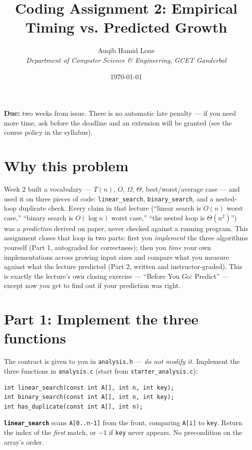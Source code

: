 \documentclass[11pt]{article}
\title{Coding Assignment 2: Empirical Timing vs. Predicted Growth}
\author{Auqib Hamid Lone\\[0.3em]
  \emph{Department of Computer Science \& Engineering}, \emph{GCET Ganderbal}}
\date{\today}
\begin{document}
\maketitle

\noindent\textbf{Due:} two weeks from issue. There is no automatic late penalty --- if you need more time, ask before the deadline and an extension will be granted (see the course policy in the syllabus).

\section{Why this problem}

Week 2 built a vocabulary --- $T(n)$, $O$, $\Omega$, $\Theta$, best/worst/average case --- and used it on three pieces of code: \texttt{linear\_search}, \texttt{binary\_search}, and a nested-loop duplicate check. Every claim in that lecture (``linear search is $O(n)$ worst case,'' ``binary search is $O(\log n)$ worst case,'' ``the nested loop is $\Theta(n^2)$'') was a \emph{prediction} derived on paper, never checked against a running program. This assignment closes that loop in two parts: first you \emph{implement} the three algorithms yourself (Part 1, autograded for correctness); then you \emph{time} your own implementations across growing input sizes and compare what you measure against what the lecture predicted (Part 2, written and instructor-graded). This is exactly the lecture's own closing exercise --- ``Before You Go: Predict'' --- except now you get to find out if your prediction was right.

\section{Part 1: Implement the three functions}

The contract is given to you in \texttt{analysis.h} --- \emph{do not modify it}. Implement the three functions in \texttt{analysis.c} (start from \texttt{starter\_analysis.c}):

\begin{verbatim}
int linear_search(const int A[], int n, int key);
int binary_search(const int A[], int n, int key);
int has_duplicate(const int A[], int n);
\end{verbatim}

\textbf{\texttt{linear\_search}} scans \texttt{A[0..n-1]} from the front, comparing \texttt{A[i]} to \texttt{key}. Return the index of the \emph{first} match, or $-1$ if \texttt{key} never appears. No precondition on the array's order.
\end{document}
